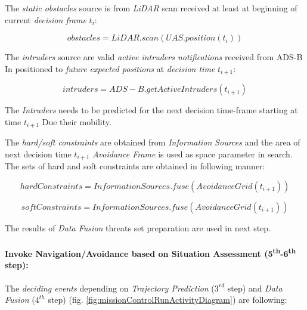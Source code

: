The \emph{static obstacles} source is from \emph{LiDAR} scan received at least at beginning of current \emph{decision frame} $t_i$:

\begin{equation*}
        obstacles=LiDAR.scan(UAS.position(t_i))
\end{equation*}

The \emph{intruders} source are valid \emph{active intruders notifications} received from ADS-B In positioned to \emph{future expected positions} at \emph{decision time} $t_{i+1}$:

\begin{equation*}
        intruders=ADS-B.get Active Intruders(t_{i+1})
\end{equation*}

\begin{note}
    The \emph{Intruders} needs to be predicted for the next decision time-frame starting at time $t_{i+1}$ Due their mobility.
\end{note}

The \emph{hard/soft constraints} are obtained from \emph{Information Sources} and the area of next decision time $t_{i+1}$ \emph{Avoidance Frame} is used as space parameter in search. The sets of hard and soft constraints are obtained in following manner:

\begin{equation*}
    hard Constraints= Information Sources.fuse(Avoidance Grid(t_{i+1}))
\end{equation*}

\begin{equation*}        
        soft Constraints=Information Sources.fuse(Avoidance Grid(t_{i+1}))
\end{equation*}

The results of \emph{Data Fusion} threats set preparation are used in next step.


\paragraph{Invoke Navigation/Avoidance based on Situation Assessment (5\textsuperscript{th}-6\textsuperscript{th} step):} The \emph{deciding events} depending on \emph{Trajectory Prediction} ($3^{rd}$ step) and \emph{Data Fusion} ($4^{th}$ step) (fig. \ref{fig:missionControlRunActivityDiagram}) are following:

